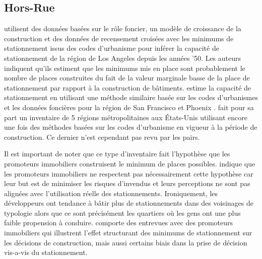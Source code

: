   \subsection{Hors-Rue}
  \textcite{Chester:ParkingInfrastructure:2015} utilisent des données basées sur le rôle foncier, un modèle de croissance de la construction et des données de recensement croisées avec les minimums de stationnement issus des codes d'urbanisme pour inférer la capacité de stationnement de la région de Los Angeles depuis les années '50. Les auteurs indiquent qu'ils estiment que les minimums mis en place sont probablement le nombre de places construites du fait de la valeur marginale basse de la place de stationnement par rapport à la construction de bâtiments. \citeauthor{Chester:InventoryingSan:2022} estime la capacité de stationnement en utilisant une méthode similaire basée sur les codes d'urbanismes et les données foncières pour la région de San Francisco \parencite{Chester:InventoryingSan:2022} et Phoenix \parencite{Hoehne:ValleySundrenched:2019}. \textcite{Scharnhorst:QuantifiedParking:2018} fait pour sa part un inventaire de 5 régions métropolitaines aux États-Unis utilisant encore une fois des méthodes basées sur les codes d'urbanisme en vigueur à la période de construction. Ce dernier n'est cependant pas revu par les pairs. \par 
  Il est important de noter que ce type d'inventaire fait l'hypothèse que les promoteurs immobiliers construisent le minimum de places possibles. \textcite{Stangl:ParkingLots:2019} indique que les promoteurs immobiliers ne respectent pas nécessairement cette hypothèse car leur but est de minimiser les risques d'invendus et leurs perceptions ne sont pas alignées avec l'utilisation réelle des stationnements. Ironiquement, les développeurs ont tendance à bâtir plus de stationnements dans des voisinages de typologie  \fg{} \parencite{Voulgaris:SynergisticNeighborhood:2017} alors que ce sont précisément les quartiers où les gens ont une plus faible propension à conduire. \textcite{Stangl:ParkingLots:2019} comporte des entrevues avec des promoteurs immobiliers qui illustrent l'effet structurant des minimums de stationnement sur les décisions de construction, mais aussi certains biais dans la prise de décision vis-a-vis du stationnement.

